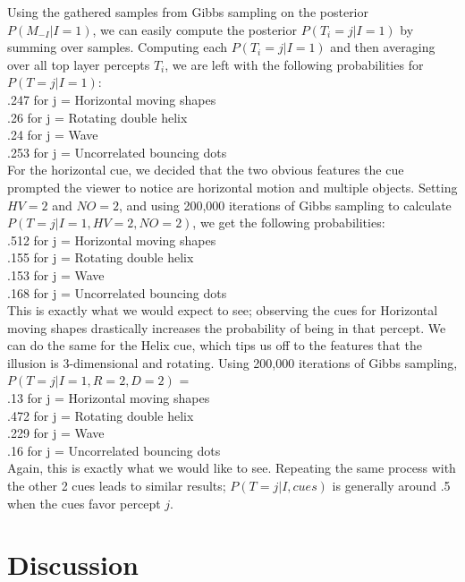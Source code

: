\documentclass{article} %
\begin{document}
Using the gathered samples from Gibbs sampling on the posterior $P(M_{-I}|I=1)$, we can easily compute the posterior $P(T_i = j|I=1)$ by summing over samples. Computing each $P(T_i = j|I=1)$ and then averaging over all top layer percepts $T_i$, we are left with the following probabilities for $P(T=j|I=1)$: \\ 
.247 for j = Horizontal moving shapes \\
.26 for j = Rotating double helix \\
.24 for j = Wave \\
.253 for j = Uncorrelated bouncing dots \\ 

For the horizontal cue, we decided that the two obvious features the cue prompted the viewer to notice are horizontal motion and multiple objects. Setting $HV = 2$ and $NO = 2$, and using 200,000 iterations of Gibbs sampling to calculate $P(T=j|I=1, HV=2, NO=2)$, we get the following probabilities: \\
.512 for j = Horizontal moving shapes \\
.155 for j = Rotating double helix \\
.153 for j = Wave \\
.168 for j = Uncorrelated bouncing dots \\ 

This is exactly what we would expect to see; observing the cues for Horizontal moving shapes drastically increases the probability of being in that percept. We can do the same for the Helix cue, which tips us off to the features that the illusion is 3-dimensional and rotating. Using 200,000 iterations of Gibbs sampling, $P(T=j|I=1, R=2, D=2)$ = \\
.13 for j = Horizontal moving shapes \\
.472 for j = Rotating double helix \\
.229 for j = Wave \\
.16 for j = Uncorrelated bouncing dots \\ 

Again, this is exactly what we would like to see. Repeating the same process with the other 2 cues leads to similar results; $P(T=j|I,cues)$ is generally around .5 when the cues favor percept $j$. 


\section{Discussion}
\end{document}
